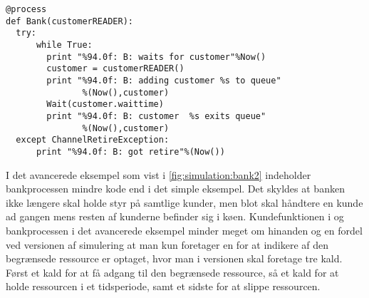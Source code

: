 \begin{lstlisting}[firstnumber=33 ,float=hbtp, label=fig:sim:bank2, caption=Bankprocessen hvor banken er en begrænset ressource. ]
  @process
def Bank(customerREADER):
  try:
      while True:
        print "%94.0f: B: waits for customer"%Now()
        customer = customerREADER()
        print "%94.0f: B: adding customer %s to queue"
               %(Now(),customer)
        Wait(customer.waittime)
        print "%94.0f: B: customer  %s exits queue"
               %(Now(),customer)
  except ChannelRetireException:
      print "%94.0f: B: got retire"%(Now())

\end{lstlisting}
I det avancerede eksempel som vist i  \cref{fig:simulation:bank2} indeholder bankprocessen mindre kode end i det simple eksempel. Det skyldes at banken ikke længere skal holde styr på samtlige kunder, men blot skal håndtere en kunde ad gangen mens resten af kunderne befinder sig i køen. Kundefunktionen i \simpy og bankprocessen i det avancerede eksempel minder meget om hinanden og en fordel ved \csp versionen af simulering at man kun foretager en  for at indikere af den begrænsede ressource er optaget, hvor man i \simpy versionen skal foretage tre kald. Først et kald for at få adgang til den begrænsede ressource, så et kald for at holde ressourcen i et tidsperiode, samt et sidste for at slippe ressourcen.

  
